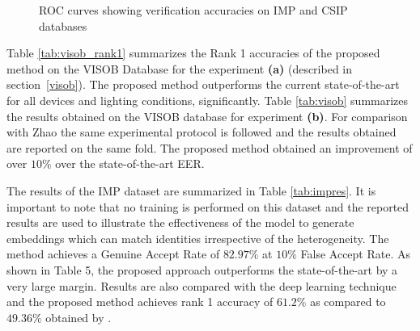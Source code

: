 \documentclass[10pt,twocolumn,letterpaper]{article}
\begin{document}
\begin{figure*}[t!]
\centering
  \hspace{2pt}
   \hspace{2pt}
 
\caption{ROC curves showing verification accuracies on IMP and CSIP databases}\label{fig:cmc}
  \vspace{-8pt}
   \label{cmc}
  
   \end{figure*}

Table \ref{tab:visob_rank1} summarizes the Rank 1 accuracies of the proposed method on the VISOB Database \cite{VISOB_Dataset} for the experiment \textbf{(a)} (described in section~\ref{visob}). The proposed method outperforms the current state-of-the-art for all devices and lighting conditions, significantly.
Table \ref{tab:visob} 
summarizes the results obtained on the VISOB database for experiment \textbf{(b)}. For comparison with Zhao \etal \cite{zhao2018improving} the same experimental protocol is followed and the results obtained are reported on the same fold. The proposed method obtained an improvement of over $10\%$ over the state-of-the-art EER. 

The results of the IMP dataset are summarized in Table \ref{tab:impres}. It is important to note that no training is performed on this dataset and the reported results are used to illustrate the effectiveness of the model to generate embeddings which can match identities irrespective of the heterogeneity. The method achieves a Genuine Accept Rate of $82.97\%$ at $10\%$ False Accept Rate. As shown in Table 5, the proposed approach  outperforms the state-of-the-art by a very large margin. Results are also compared with the deep learning technique \cite{schroff2015facenet} and the proposed method achieves rank 1 accuracy of $61.2\%$ as compared to $49.36\%$ obtained by \cite{schroff2015facenet}.
\end{document}
